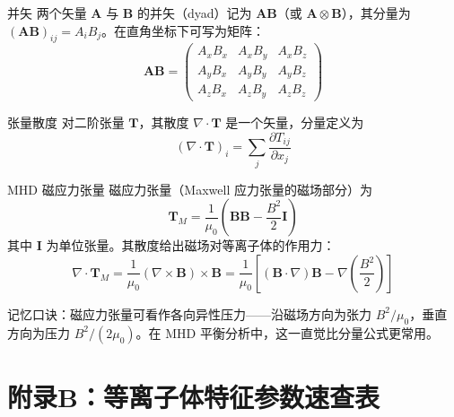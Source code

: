 \documentclass[12pt,a4paper,openany,oneside]{book}
\newcommand{\vect}[1]{\bm{#1}}
\newcommand{\grad}{\nabla}
\newcommand{\curl}{\nabla\times}
\newcommand{\divg}{\nabla\cdot}
\newcommand{\tens}[1]{\bm{#1}}
\begin{document}
\begin{definition}{并矢}{}{}
两个矢量 $\vect{A}$ 与 $\vect{B}$ 的并矢（dyad）记为 $\vect{A}\vect{B}$（或 $\vect{A}\otimes\vect{B}$），其分量为 $(\vect{A}\vect{B})_{ij}=A_iB_j$。在直角坐标下可写为矩阵：
\begin{equation}
\vect{A}\vect{B} =
\begin{pmatrix}
A_xB_x & A_xB_y & A_xB_z \\
A_yB_x & A_yB_y & A_yB_z \\
A_zB_x & A_zB_y & A_zB_z
\end{pmatrix}
\end{equation}
\end{definition}

\begin{definition}{张量散度}{}{}
对二阶张量 $\tens{T}$，其散度 $\divg\tens{T}$ 是一个矢量，分量定义为
\begin{equation}
(\divg\tens{T})_i = \sum_j \frac{\partial T_{ij}}{\partial x_j}
\end{equation}
\end{definition}

\begin{theorem}{MHD 磁应力张量}{}{}
磁应力张量（Maxwell 应力张量的磁场部分）为
\begin{equation}
\tens{T}_M = \frac{1}{\mu_0}\left(\vect{B}\vect{B} - \frac{B^2}{2}\tens{I}\right)
\end{equation}
其中 $\tens{I}$ 为单位张量。其散度给出磁场对等离子体的作用力：
\begin{equation}
\divg\tens{T}_M = \frac{1}{\mu_0}(\curl\vect{B})\times\vect{B}
= \frac{1}{\mu_0}\left[ (\vect{B}\cdot\grad)\vect{B} - \grad\left(\frac{B^2}{2}\right) \right]
\end{equation}
\end{theorem}

\begin{tip}
记忆口诀：磁应力张量可看作各向异性压力——沿磁场方向为张力 $B^2/\mu_0$，垂直方向为压力 $B^2/(2\mu_0)$。在 MHD 平衡分析中，这一直觉比分量公式更常用。
\end{tip}


\chapter*{附录B：等离子体特征参数速查表}
\end{document}
